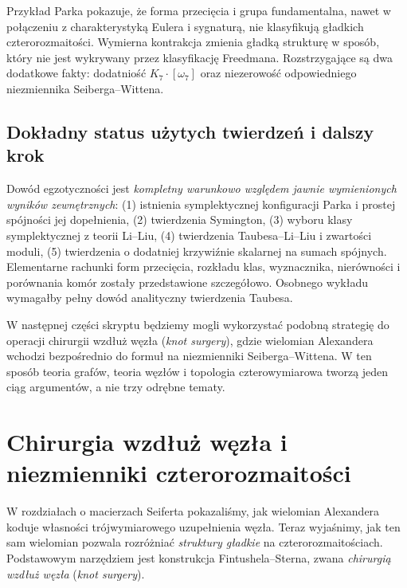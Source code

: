 \begin{uwaga}
Przykład Parka pokazuje, że forma przecięcia i grupa
fundamentalna, nawet w połączeniu z charakterystyką Eulera
i sygnaturą, nie klasyfikują gładkich czterorozmaitości.
Wymierna kontrakcja zmienia gładką strukturę w sposób,
który nie jest wykrywany przez klasyfikację Freedmana.
Rozstrzygające są dwa dodatkowe fakty: dodatniość
$K_7\cdot[\omega_7]$ oraz niezerowość odpowiedniego
niezmiennika Seiberga--Wittena.
\end{uwaga}

\section{Dokładny status użytych twierdzeń i dalszy krok}
\label{sec:tg-park14-status}

Dowód egzotyczności jest \emph{kompletny warunkowo względem
jawnie wymienionych wyników zewnętrznych}:
(1) istnienia symplektycznej konfiguracji Parka i prostej
spójności jej dopełnienia, (2) twierdzenia Symington,
(3) wyboru klasy symplektycznej z teorii Li--Liu,
(4) twierdzenia Taubesa--Li--Liu i zwartości moduli,
(5) twierdzenia o dodatniej krzywiźnie skalarnej
na sumach spójnych.
Elementarne rachunki form przecięcia, rozkładu klas,
wyznacznika, nierówności i porównania komór zostały
przedstawione szczegółowo. Osobnego wykładu wymagałby
pełny dowód analityczny twierdzenia Taubesa.

W następnej części skryptu będziemy mogli wykorzystać
podobną strategię do operacji chirurgii wzdłuż węzła
(\emph{knot surgery}), gdzie wielomian Alexandera
wchodzi bezpośrednio do formuł na niezmienniki
Seiberga--Wittena. W ten sposób teoria grafów,
teoria węzłów i topologia czterowymiarowa tworzą
jeden ciąg argumentów, a nie trzy odrębne tematy.


\chapter{Chirurgia wzdłuż węzła i niezmienniki czterorozmaitości}
\label{ch:tg-knot-surgery}

W rozdziałach o macierzach Seiferta pokazaliśmy, jak wielomian
Alexandera koduje własności trójwymiarowego uzupełnienia węzła.
Teraz wyjaśnimy, jak ten sam wielomian pozwala rozróżniać
\emph{struktury gładkie} na czterorozmaitościach. Podstawowym
narzędziem jest konstrukcja Fintushela--Sterna, zwana
\emph{chirurgią wzdłuż węzła} (\emph{knot surgery}).


